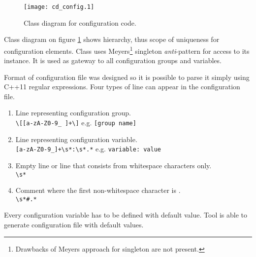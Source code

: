 \begin{figure}[h!]
	\caption{Class diagram for configuration code.}
	\label{cd-configuration}
	\vspace{0.5cm}
	\centering
		\texttt{[image: cd\_config.1]}
\end{figure}

Class diagram on figure \ref{cd-configuration} shows hierarchy, thus scope of uniqueness for configuration elements. Class  uses Meyers\footnote{Drawbacks of Meyers approach for singleton are not present.} singleton \emph{anti}-pattern for access to its instance. It is used as gateway to all configuration groups and variables.

Format of configuration file was designed so it is possible to parse it simply using C++11 regular expressions. Four types of line can appear in the configuration file.

\begin{enumerate}
\item{Line representing configuration group.\\ \verb$\[[a-zA-Z0-9_ ]+\]$ e.g. \verb$[group name]$}  
\item{Line representing configuration variable. \\ \verb$[a-zA-Z0-9_]+\s*:\s*.*$ e.g. \verb$variable: value$}
\item{Empty line or line that consists from whitespace characters only. \\ \verb$\s*$}
\item{Comment where the first non-whitespace character is \code{\#}. \\ \verb$\s*#.*$}
\end{enumerate}

Every configuration variable has to be defined with default value. Tool is able to generate configuration file with default values.